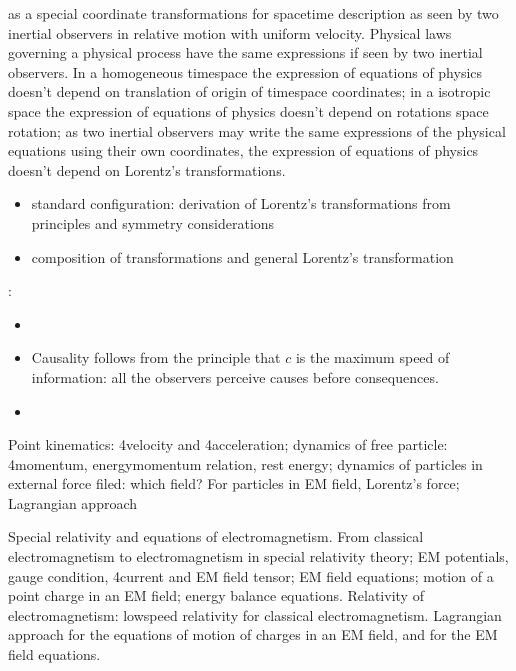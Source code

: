 \documentclass[letterpaper,10pt,english]{jupyterBook}
\begin{document}
\sphinxAtStartPar
{} as a special coordinate transformations for space\sphinxhyphen{}time description as seen by two inertial observers in relative motion with uniform velocity. Physical laws governing a physical process have the same expressions if seen by two inertial observers. In a homogeneous time\sphinxhyphen{}space the expression of equations of physics doesn’t depend on translation of origin of time\sphinxhyphen{}space coordinates; in a isotropic space the expression of equations of physics doesn’t depend on rotations space rotation; as two inertial observers may write the same expressions of the physical equations using their own coordinates, the expression of equations of physics doesn’t depend on Lorentz’s transformations.
\begin{itemize}
\item {} 
\sphinxAtStartPar
standard configuration: derivation of Lorentz’s transformations from principles and symmetry considerations

\item {} 
\sphinxAtStartPar
composition of transformations and general Lorentz’s transformation

\end{itemize}

\sphinxAtStartPar
{}:
\begin{itemize}
\item {} 
\sphinxAtStartPar
{}

\item {} 
\sphinxAtStartPar
{} Causality follows from the principle that \(c\) is the maximum speed of information: all the observers perceive causes before consequences.

\item {} 
\sphinxAtStartPar
{}

\end{itemize}

\sphinxAtStartPar
{} Point kinematics: 4\sphinxhyphen{}velocity and 4\sphinxhyphen{}acceleration; dynamics of free particle: 4\sphinxhyphen{}momentum, energy\sphinxhyphen{}momentum relation, rest energy; dynamics of particles in external force filed: which field? For particles in EM field, Lorentz’s force; Lagrangian approach

\sphinxAtStartPar
{} Special relativity and equations of electromagnetism. From classical electromagnetism to electromagnetism in special relativity theory; EM potentials, gauge condition, 4\sphinxhyphen{}current and EM field tensor; EM field equations; motion of a point charge in an EM field; energy balance equations. Relativity of electromagnetism: low\sphinxhyphen{}speed relativity for classical electromagnetism. Lagrangian approach for the equations of motion of charges in an EM field, and for the EM field equations.
\end{document}
